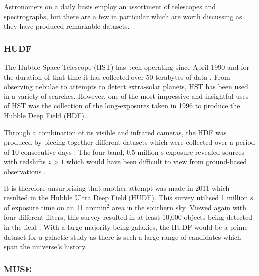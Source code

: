 \documentclass[12pt, twocolumn]{revtex4-1}    %
\begin{document}
Astronomers on a daily basis employ an assortment of telescopes and spectrographs, but there are a few in particular which are worth discussing as they have produced remarkable datasets.

\subsubsection*{HUDF}

The Hubble Space Telescope (HST) has been operating since April 1990 and for the duration of that time it has collected over 50 terabytes of data \citep{mccoy_space_sciences}. From observing nebulae to attempts to detect extra-solar planets, HST has been used in a variety of searches. However, one of the most impressive and insightful uses of HST was the collection of the long-exposures taken in 1996 to produce the Hubble Deep Field (HDF). 

Through a combination of its visible and infrared cameras, the HDF was produced by piecing together different datasets which were collected over a period of 10 consecutive days \citep{mccoy_space_sciences, williams_hdp}. The four-band, 0.5 million s exposure revealed sources with redshifts $z>1$ which would have been difficult to view from ground-based observations \citep{beckwith_hudf}. 


It is therefore unsurprising that another attempt was made in 2011 which resulted in the Hubble Ultra Deep Field (HUDF). This survey utilised 1 million s of exposure time on an 11 arcmin$^2$ area in the southern sky. Viewed again with four different filters, this survey resulted in at least 10,000 objects being detected in the field \citep{beckwith_hudf}. With a large majority being galaxies, the HUDF would be a prime dataset for a galactic study as there is such a large range of candidates which span the universe's history. 



\subsubsection*{MUSE}
\end{document}
